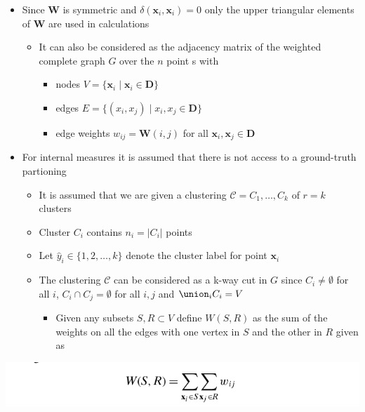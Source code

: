 \documentclass[11pt]{article}
\begin{document}
\begin{itemize}
\item Since \(\mathbf W\) is symmetric and \(\delta(\pmb x_i, \pmb x_i) = 0\) only the upper triangular elements of \(\mathbf W\) are used in calculations
\begin{itemize}
\item It can also be considered as the adjacency matrix of the weighted complete graph \(G\) over the \(n\) point s with
\begin{itemize}
\item nodes \(V=\{\pmb x_i \mid \pmb x_i \in \mathbf D\}\)
\item edges \(E = \{(x_i,x_j) \mid x_i,x_j \in \mathbf D\}\)
\item edge weights \(w_{ij} = \mathbf W(i,j)\) for all \(\pmb x_i, \pmb x_j \in \mathbf D\)
\end{itemize}
\end{itemize}

\item For internal measures it is assumed that there is not access to a ground-truth partioning
\begin{itemize}
\item It is assumed that we are given a clustering \(\mathcal C = C_1, \dots, C_k\) of \(r=k\) clusters
\item Cluster \(C_i\) contains \(n_i = |C_i|\) points
\item Let \(\hat y_i \in \{1,2,\dots, k\}\) denote the cluster label for point \(\pmb x_i\)
\item The clustering \(\mathcal C\) can be considered as a k-way cut in \(G\) since \(C_i \ne \emptyset\) for all \(i\), \(C_i \cap C_j = \emptyset\) for all \(i,j\) and \(\union_i C_i = V\)
\begin{itemize}
\item Given any subsets \(S,R \subset V\) define \(W(S,R)\) as the sum of the weights on all the edges with one vertex in \(S\) and the other in \(R\) given as
\end{itemize}
\end{itemize}
\end{itemize}
\begin{center}
\includegraphics[width=.9\linewidth]{Clustering Validation/screenshot_2018-11-27_23-15-40.png}
\end{center}
\end{document}
